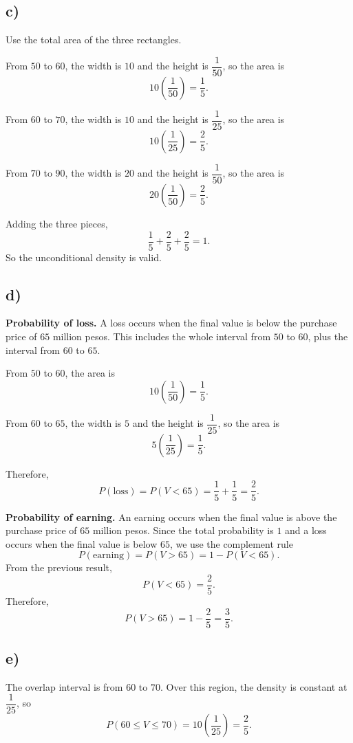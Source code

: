 \subsection*{c)}
Use the total area of the three rectangles.

From $50$ to $60$, the width is $10$ and the height is $\dfrac{1}{50}$, so the area is
\[
10\left(\frac{1}{50}\right)=\frac{1}{5}.
\]

From $60$ to $70$, the width is $10$ and the height is $\dfrac{1}{25}$, so the area is
\[
10\left(\frac{1}{25}\right)=\frac{2}{5}.
\]

From $70$ to $90$, the width is $20$ and the height is $\dfrac{1}{50}$, so the area is
\[
20\left(\frac{1}{50}\right)=\frac{2}{5}.
\]

Adding the three pieces,
\[
\frac{1}{5}+\frac{2}{5}+\frac{2}{5}=1.
\]
So the unconditional density is valid.

\subsection*{d)}
\textbf{Probability of loss.} A loss occurs when the final value is below the purchase price of $65$ million pesos. This includes the whole interval from $50$ to $60$, plus the interval from $60$ to $65$.

From $50$ to $60$, the area is
\[
10\left(\frac{1}{50}\right)=\frac{1}{5}.
\]

From $60$ to $65$, the width is $5$ and the height is $\dfrac{1}{25}$, so the area is
\[
5\left(\frac{1}{25}\right)=\frac{1}{5}.
\]

Therefore,
\[
P(\text{loss})=P(V<65)=\frac{1}{5}+\frac{1}{5}=\frac{2}{5}.
\]

\textbf{Probability of earning.}
An earning occurs when the final value is above the purchase price of $65$ million pesos. Since the total probability is $1$ and a loss occurs when the final value is below $65$, we use the complement rule
\[
P(\text{earning})=P(V>65)=1-P(V<65).
\]
From the previous result,
\[
P(V<65)=\frac{2}{5}.
\]
Therefore,
\[
P(V>65)=1-\frac{2}{5}=\frac{3}{5}.
\]

\subsection*{e)}
The overlap interval is from $60$ to $70$. Over this region, the density is constant at $\dfrac{1}{25}$, so
\[
P(60\le V\le 70)=10\left(\frac{1}{25}\right)=\frac{2}{5}.
\]

